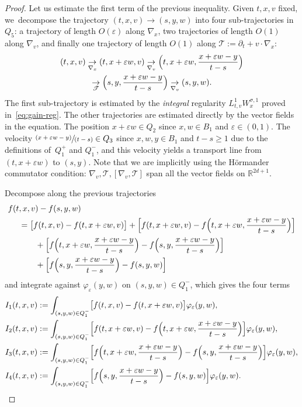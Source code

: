 \documentclass[10pt]{amsart}
\let\mathcal\mathscr
\newcommand{\pspfrac}[2]{\sfrac{(#1)}{(#2)}}
\theoremstyle{definition}
\theoremstyle{remark}
\newcommand\R{{\mathbb R}}
\newcommand{\cT}{\mathcal T}
\let\var\varepsilon
\begin{document}
\begin{proof}
Let us estimate the first term of the previous
inequality. Given $t,x,v$ fixed, we~decompose the trajectory
$(t,x,v)\to (s,y,w)$ into four sub-trajectories in
$Q_5$: a trajectory of length $O(\var)$ along $\nabla_x$, two
trajectories of length $O(1)$ along $\nabla_v$, and finally one
trajectory of length $O(1)$ along
$\cT := \partial_t + v \cdot \nabla_x$:
\begin{multline*}
(t,x,v)\underset{\nabla_x}{\to}
(t,x+\varepsilon w,v) \underset{\nabla_v}{\to}
\Bigl(t,x+\varepsilon w, \frac{x+\varepsilon w
-y}{t-s} \Bigr) \\
\underset{\cT}{\to} \Bigl(s,
y,\frac{x+\varepsilon w -y}{t-s} \Bigr)
\underset{\nabla_v}{\to} (s,y,w).
\end{multline*}
The first sub-trajectory is estimated by the {\it integral}
regularity $L^1_{t,v} W^{\sigma,1}_{x}$ proved
in~\eqref{eq:gain-reg}. The other trajectories are estimated
directly by the vector fields in the equation. The position
$x+\varepsilon w \in Q_2$ since $x,w \in B_1$ and
$\var \in (0,1)$. The velocity
$\pspfrac{x+\varepsilon w -y}{t-s} \in Q_3$ since $x,w,y \in B_1$
and $t-s\geq 1$ due to the definitions of~$Q_{1}^+$ and
$Q_{1}^{-}$, and this velocity yields a transport line from
$(t,x+\varepsilon w)$ to $(s,y)$. Note that we are implicitly
using the Hörmander commutator condition:
$\nabla_v,\cT, [\nabla_v,\cT]$ span all the vector fields on
$\R^{2d+1}$.

Decompose along the previous trajectories
\begin{align*}
f(t&,x,v)-f(s,y,w) \\
& = \bigl[ f(t,x,v)-f(t,x+\varepsilon w,v) \bigr] +
\Bigl[ f(t,x+\varepsilon
w,v)- f \Bigl(t,x+\varepsilon w,\frac{x+\varepsilon w -y}{t-s}
\Bigr) \Bigr] \\
& \qquad + \Bigl[ f \Bigl(t,x+\varepsilon w,\frac{x+\varepsilon w
-y}{t-s} \Bigr)- f \Bigl(s,y,\frac{x+\varepsilon w
-y}{t-s} \Bigr) \Bigr] \\
& \qquad + \Bigl[ f \Bigl(s,y,\frac{x+\varepsilon w
-y}{t-s} \Bigr)-f(s,y,w) \Bigr]
\end{align*}
and integrate against $\varphi_\var(y,w)$ on
$(s,y,w)\in Q_{1}^-$, which gives the four terms
\begin{align*}
I_1(t,x,v)
& := \int_{(s,y,w)\in Q_1^{-}}
\bigl[ f(t,x,v)-f(t,x+\varepsilon
w,v)\bigr] \varphi_\var(y,w),\\
I_2(t,x,v)
& := \int_{(s,y,w)\in Q_1^{-}}
\Bigl[ f(t,x+\varepsilon w,v)-f\Bigl(t,x+\varepsilon
w,\frac{x+\varepsilon w -y}{t-s}\Bigr)\Bigr]
\varphi_\var(y,w), \\
I_3(t,x,v)
& := \int_{(s,y,w)\in Q_1^{-}} \Bigl[ f\Bigl(t,x+\varepsilon
w,\frac{x+\varepsilon w
-y}{t-s}\Bigr)-f\Bigl(s,y,\frac{x+\varepsilon w
-y}{t-s}\Bigr)\Bigr] \varphi_\var(y,w), \\
I_4(t,x,v)
& := \int_{(s,y,w)\in Q_1^{-}}
\Bigl[ f\Bigl(s,y,\frac{x+\varepsilon w
-y}{t-s}\Bigr)-f(s,y,w)\Bigr] \varphi_\var(y,w).
\end{align*}


\end{proof}
\end{document}
